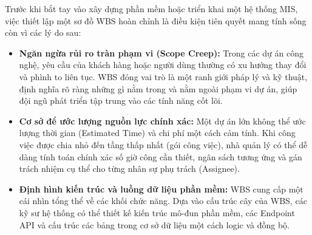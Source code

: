 \documentclass[a4paper,13.5pt]{extreport}
\begin{document}
Trước khi bắt tay vào xây dựng phần mềm hoặc triển khai một hệ thống MIS, việc thiết lập một sơ đồ WBS hoàn chỉnh là điều kiện tiên quyết mang tính sống còn vì các lý do sau:
\begin{itemize}
    \item \textbf{Ngăn ngừa rủi ro tràn phạm vi (Scope Creep):} Trong các dự án công nghệ, yêu cầu của khách hàng hoặc người dùng thường có xu hướng thay đổi và phình to liên tục. WBS đóng vai trò là một ranh giới pháp lý và kỹ thuật, định nghĩa rõ ràng những gì nằm trong và nằm ngoài phạm vi dự án, giúp đội ngũ phát triển tập trung vào các tính năng cốt lõi.
    \item \textbf{Cơ sở để ước lượng nguồn lực chính xác:} Một dự án lớn không thể ước lượng thời gian (Estimated Time) và chi phí một cách cảm tính. Khi công việc được chia nhỏ đến tầng thấp nhất (gói công việc), nhà quản lý có thể dễ dàng tính toán chính xác số giờ công cần thiết, ngân sách tương ứng và gán trách nhiệm cụ thể cho từng nhân sự phụ trách (Assignee).
    \item \textbf{Định hình kiến trúc và luồng dữ liệu phần mềm:} WBS cung cấp một cái nhìn tổng thể về các khối chức năng. Dựa vào cấu trúc cây của WBS, các kỹ sư hệ thống có thể thiết kế kiến trúc mô-đun phần mềm, các Endpoint API và cấu trúc các bảng trong cơ sở dữ liệu một cách logic và đồng bộ.
\end{itemize}
\end{document}
